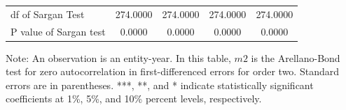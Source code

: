 \documentclass[10pt,twoside]{article}
\begin{document}
\begin{table}[H]
\begin{threeparttable}
\begin{tabular}{l|c c| c c}
df of Sargan Test& 274.0000         & 274.0000         & 274.0000         & 274.0000         \\
P value of Sargan test&   0.0000         &   0.0000         &   0.0000         &   0.0000         \\
    \bottomrule
  \end{tabular} 
\begin{tablenotes}
\small
\item Note: An observation is an entity-year. In this table, $m2$ is the Arellano-Bond test for zero autocorrelation in first-differenced errors for order two. Standard errors are in parentheses. ***, **, and * indicate statistically significant coefficients at 1\%, 5\%, and 10\% percent levels, respectively.
 \end{tablenotes}
 \end{threeparttable}
\end{table}
\end{document}
